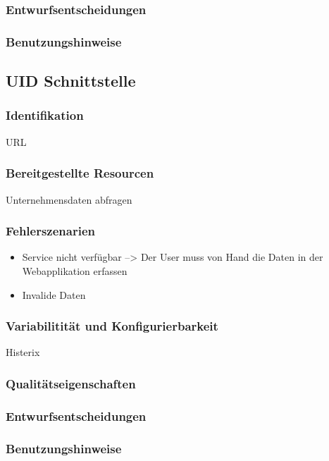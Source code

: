 \subsubsection{Entwurfsentscheidungen} 

\subsubsection{Benutzungshinweise} 

\subsection{UID Schnittstelle}

\subsubsection{Identifikation}
URL

\subsubsection{Bereitgestellte Resourcen}
Unternehmensdaten abfragen

\subsubsection{Fehlerszenarien}
\begin{itemize}
	\item Service nicht verfügbar --> Der User muss von Hand die Daten in der Webapplikation erfassen
	\item Invalide Daten 
\end{itemize}



\subsubsection{Variabilitität und Konfigurierbarkeit}
Histerix

\subsubsection{Qualitätseigenschaften}

\subsubsection{Entwurfsentscheidungen} 

\subsubsection{Benutzungshinweise} 

